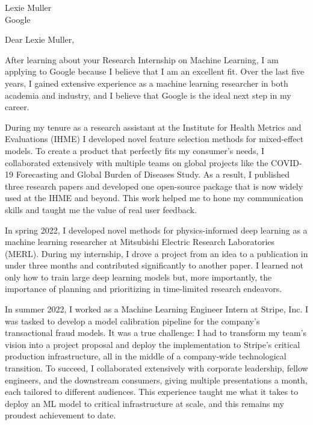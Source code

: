   \begin{letter}{%
  	Lexie Muller \\
    Google \\
    }
    
  
    
    \opening{Dear Lexie Muller,} %
    
    
    After learning about your Research Internship on Machine Learning, I am applying to Google because I believe that I am an excellent fit. Over the last five years, I gained extensive experience as a machine learning researcher in both academia and industry, and I believe that Google is the ideal next step in my career. 

During my tenure as a research assistant at the Institute for Health Metrics and Evaluations (IHME) I developed novel feature selection methods for mixed-effect models. To create a product that perfectly fits my consumer's needs, I collaborated extensively with multiple teams on global projects like the COVID-19 Forecasting and Global Burden of Diseases Study. As a result, I published three research papers and developed one open-source package that is now widely used at the IHME and beyond. This work helped me to hone my communication skills and taught me the value of real user feedback.

In spring 2022, I developed novel methods for physics-informed deep learning as a machine learning researcher at Mitsubishi Electric Research Laboratories (MERL). During my internship, I drove a project from an idea to a publication in under three months and contributed significantly to another paper. I learned not only how to train large deep learning models but, more importantly, the importance of planning and prioritizing in time-limited research endeavors.

In summer 2022, I worked as a Machine Learning Engineer Intern at Stripe, Inc. I was tasked to develop a model calibration pipeline for the company's transactional fraud models. It was a true challenge: I had to transform my team's vision into a project proposal and deploy the implementation to Stripe's critical production infrastructure, all in the middle of a company-wide technological transition. To succeed, I collaborated extensively with corporate leadership, fellow engineers, and the downstream consumers, giving multiple presentations a month, each tailored to different audiences. This experience taught me what it takes to deploy an ML model to critical infrastructure at scale, and this remains my proudest achievement to date. 


\end{letter}
